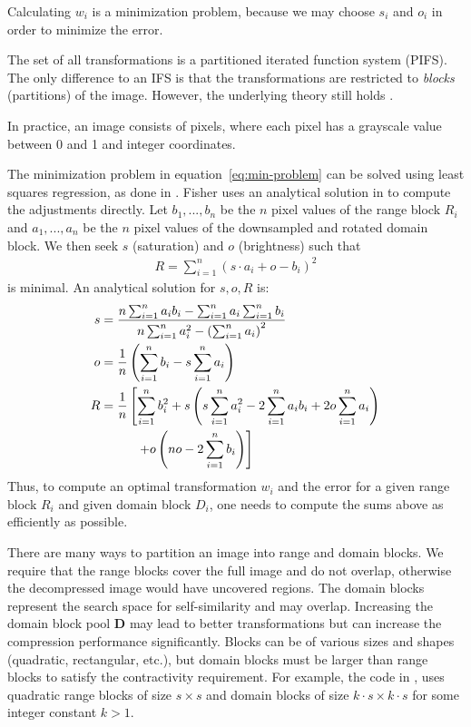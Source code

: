 Calculating $w_i$ is a minimization problem, because we may choose $s_i$ and
$o_i$ in order to minimize the error.

The set of all transformations is a partitioned iterated function system (PIFS).
The only difference to an IFS is that the transformations are restricted to
\textit{blocks} (partitions) of the image. However, the underlying theory still
holds \cite{fisher2012}.

\label{par-practical-implementation}
In practice, an image consists of pixels, where each pixel has a grayscale value between 0 and 1 and integer coordinates.

The minimization problem in equation~\eqref{eq:min-problem} can be solved using least squares regression, as done in \cite{github-python}.
Fisher uses an analytical solution in \cite{fisher2012} to compute the adjustments directly. Let $b_1, ..., b_n$ be the $n$ pixel values of the range block $R_i$
and $a_1,...,a_n$ be the $n$ pixel values of the downsampled and rotated domain block. We then seek $s$ (saturation) and $o$ (brightness) such that
\begin{align*}
  R = \sum_{i=1}^n (s \cdot a_i + o - b_i)^2
\end{align*}
is minimal. An analytical solution for $s,o,R$ is:
\begin{align}
    s &= \frac{n \sum_{i=1}^n a_i b_i - \sum_{i=1}^n a_i \sum_{i=1}^n b_i}{n \sum_{i=1}^n a_i^2 - \left(\sum_{i=1}^n a_i \right)^2} \label{contrast}\\
    o &= \frac{1}{n} \left( \sum_{i=1}^n b_i - s \sum_{i=1}^n a_i \right) \label{brightness}\\
    R &= \frac{1}{n} \left[ \sum_{i=1}^n b_i^2 + s \left( s \sum_{i=1}^n a_i^2 - 2 \sum_{i=1}^n a_i b_i + 2o \sum_{i=1}^n a_i \right) \right. \notag\\
    &\text{\hspace{1cm}} \left. + o \left(no - 2 \sum_{i=1}^n b_i \right)  \right]\label{error}
\end{align}
Thus, to compute an optimal transformation $w_i$ and the error for a given range
block $R_i$ and given domain block $D_i$, one needs to compute the sums above as
efficiently as possible.

 There are many ways to partition an image into range
and domain blocks. We require that the range blocks cover the full image and do
not overlap, otherwise the decompressed image would have uncovered regions. The
domain blocks represent the search space for self-similarity and may overlap.
Increasing the domain block pool $\boldsymbol{D}$ may lead to better
transformations but can increase the compression performance significantly.
Blocks can be of various sizes and shapes (quadratic, rectangular, etc.), but
domain blocks must be larger than range blocks to satisfy the contractivity
requirement. For example, the code in \cite{github-python}, uses quadratic range
blocks of size $s \times s$ and domain blocks of size
$k\cdot s \times k \cdot s$ for some integer constant $k > 1$.

